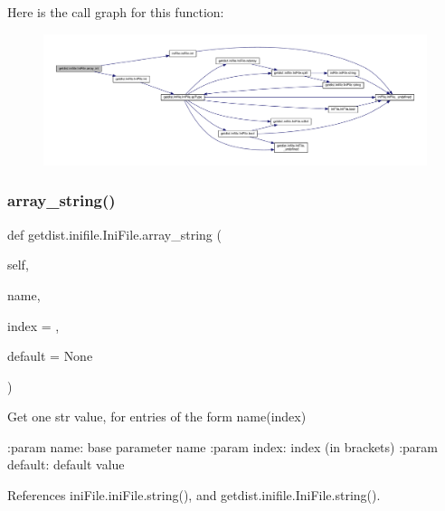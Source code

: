 Here is the call graph for this function\+:
\nopagebreak
\begin{figure}[H]
\begin{center}
\leavevmode
\includegraphics[width=350pt]{classgetdist_1_1inifile_1_1IniFile_a7a2d4f1f5cd18de58f68f53e5111baf3_cgraph}
\end{center}
\end{figure}
\mbox{\label{classgetdist_1_1inifile_1_1IniFile_a274b4bdc84fb9806adf1d36dd2a7d0ba}} 
\subsubsection{\texorpdfstring{array\+\_\+string()}{array\_string()}}
{\footnotesize\ttfamily def getdist.\+inifile.\+Ini\+File.\+array\+\_\+string (\begin{DoxyParamCaption}\item[{}]{self,  }\item[{}]{name,  }\item[{}]{index = {},  }\item[{}]{default = {\ttfamily None} }\end{DoxyParamCaption})}

\begin{DoxyVerb}Get one str value, for entries of the form name(index)

:param name: base parameter name
:param index: index (in brackets)
:param default: default value
\end{DoxyVerb}
 

References ini\+File.\+ini\+File.\+string(), and getdist.\+inifile.\+Ini\+File.\+string().


